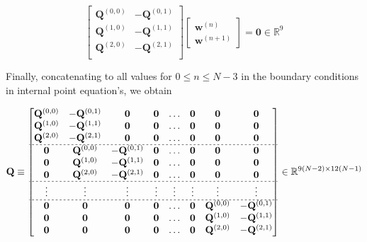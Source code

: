 \begin{equation}
\begin{bmatrix}
\mathbf{Q}^{(0,0)} & -\mathbf{Q}^{(0,1)}\\
\mathbf{Q}^{(1,0)} & -\mathbf{Q}^{(1,1)}\\
\mathbf{Q}^{(2,0)} & -\mathbf{Q}^{(2,1)}\\
\end{bmatrix}
\begin{bmatrix}
\mathbf{w}^{(n)}\\
\mathbf{w}^{(n+1)}
\end{bmatrix}
=\mathbf{0}\in \mathbb{R}^{9}
\end{equation}

Finally, 
concatenating to all values for $0 \leq n\leq N-3$
in the boundary conditions in internal point equation's, we obtain

\begin{equation}
\mathbf{Q}
\equiv
\begin{bmatrix}
\mathbf{Q}^{(0,0)} & -\mathbf{Q}^{(0,1)} & \mathbf{0} & \mathbf{0} & \hdots & \mathbf{0} & \mathbf{0} & \mathbf{0}\\
\mathbf{Q}^{(1,0)} & -\mathbf{Q}^{(1,1)} & \mathbf{0} & \mathbf{0} & \hdots & \mathbf{0} & \mathbf{0} & \mathbf{0}\\
\mathbf{Q}^{(2,0)} & -\mathbf{Q}^{(2,1)} & \mathbf{0} & \mathbf{0} & \hdots & \mathbf{0} & \mathbf{0} & \mathbf{0}\\ \hdashline[2pt/2pt]
\mathbf{0} & \mathbf{Q}^{(0,0)} & -\mathbf{Q}^{(0,1)} & \mathbf{0} & \hdots & \mathbf{0} & \mathbf{0} & \mathbf{0}\\
\mathbf{0} & \mathbf{Q}^{(1,0)} & -\mathbf{Q}^{(1,1)} & \mathbf{0} & \hdots & \mathbf{0} & \mathbf{0} & \mathbf{0}\\
\mathbf{0} & \mathbf{Q}^{(2,0)} & -\mathbf{Q}^{(2,1)} & \mathbf{0} & \hdots & \mathbf{0} & \mathbf{0} & \mathbf{0}\\ \hdashline[2pt/2pt]
\vdots     & \vdots             & \vdots             & \vdots     & \vdots & \vdots     & \vdots     & \vdots    \\ \hdashline[2pt/2pt]
\mathbf{0} & \mathbf{0}         & \mathbf{0}         & \mathbf{0} & \hdots & \mathbf{0} & \mathbf{Q}^{(0,0)} & -\mathbf{Q}^{(0,1)}\\
\mathbf{0} & \mathbf{0}         & \mathbf{0}         & \mathbf{0} & \hdots & \mathbf{0} & \mathbf{Q}^{(1,0)} & -\mathbf{Q}^{(1,1)}\\
\mathbf{0} & \mathbf{0}         & \mathbf{0}         & \mathbf{0} & \hdots & \mathbf{0} & \mathbf{Q}^{(2,0)} & -\mathbf{Q}^{(2,1)}\\
\end{bmatrix}
\in \mathbb{R}^{9(N-2)\times 12(N-1)}
\end{equation}

